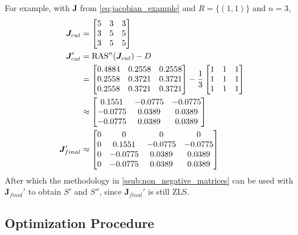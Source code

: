 For example, with $\bm{J}$ from \autoref{eq:jacobian_example} and $R=\{(1,1)\}$ and $n=3$,
\begin{align}
    \bm{J}_{cut}&=
    \begin{bmatrix}
        5&3&3\\
        3&5&5\\
        3&5&5
    \end{bmatrix}\nonumber\\
    \bm{J}_{cut}'&=\operatorname{RAS}^n(\bm{J}_{cut})-D\label{eq:jacobian_cut}\\
         &=\begin{bmatrix}
            0.4884& 0.2558& 0.2558\\
            0.2558& 0.3721& 0.3721\\
            0.2558& 0.3721& 0.3721
         \end{bmatrix} -\frac{1}{3}
         \begin{bmatrix}
             1&1&1\\
             1&1&1\\
             1&1&1
         \end{bmatrix}\nonumber\\
         &\approx
         \begin{bmatrix}
             0.1551&-0.0775&-0.0775\\
             -0.0775&0.0389&0.0389\\
             -0.0775&0.0389&0.0389\\
         \end{bmatrix}\nonumber\\
    \bm{J}_{final}'&\approx
         \begin{bmatrix}
             0&0&0&0\\
             0&0.1551&-0.0775&-0.0775\\
             0&-0.0775&0.0389&0.0389\\
             0&-0.0775&0.0389&0.0389
         \end{bmatrix}
         \label{eq:jacobian_final}
\end{align}
After which the methodology in \autoref{ssub:non_negative_matrices} can be used with $\bm{J}_{final}'$ to obtain $S'$ and $S''$, since $\bm{J}_{final}'$ is still ZLS.

\subsection{Optimization Procedure}%
\label{sub:optimization_procedure}

